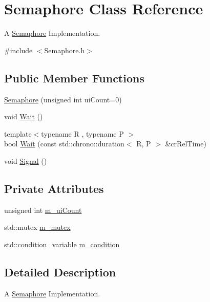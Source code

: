 \hypertarget{classSemaphore}{}\section{Semaphore Class Reference}
\label{classSemaphore}


A \hyperlink{classSemaphore}{Semaphore} Implementation.  




{\ttfamily \#include $<$Semaphore.\+h$>$}

\subsection*{Public Member Functions}
\begin{DoxyCompactItemize}
\item 
\hyperlink{classSemaphore_a0d9290d316636875ca85d1d78950a817}{Semaphore} (unsigned int ui\+Count=0)
\item 
void \hyperlink{classSemaphore_a72aabebf026e3a8b1f3e4d0fa8ee1eda}{Wait} ()
\item 
{\footnotesize template$<$typename R , typename P $>$ }\\bool \hyperlink{classSemaphore_a7f700173ae86ae623684109066e07656}{Wait} (const std\+::chrono\+::duration$<$ R, P $>$ \&cr\+Rel\+Time)
\item 
void \hyperlink{classSemaphore_a86f92f738b4486439b296d8e235895f2}{Signal} ()
\end{DoxyCompactItemize}
\subsection*{Private Attributes}
\begin{DoxyCompactItemize}
\item 
unsigned int \hyperlink{classSemaphore_a1456f105008b0c309f41211afbdd5fee}{m\+\_\+ui\+Count}
\item 
std\+::mutex \hyperlink{classSemaphore_a6490f302f311da3ce373a81672673296}{m\+\_\+mutex}
\item 
std\+::condition\+\_\+variable \hyperlink{classSemaphore_a2b04d3a53f1fc1a13d7ed5d19d9e2be9}{m\+\_\+condition}
\end{DoxyCompactItemize}


\subsection{Detailed Description}
A \hyperlink{classSemaphore}{Semaphore} Implementation. 

